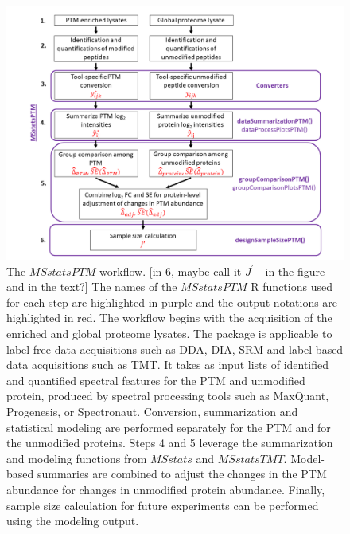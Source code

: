\documentclass[mcp]{article}
\numberwithin{table}{section}
\def\todo#1{{\color{red}[#1]}}
\begin{document}
\begin{figure}[ht]
\centering
\includegraphics[scale=.55]{images/MSstatsPTM_design.png}
\caption{The $MSstatsPTM$ workflow. \todo{in 6, maybe call it $J^{\prime}$ - in the figure and in the text?} The names of the $MSstatsPTM$ R functions used for each step are highlighted in purple and the output notations are highlighted in red. The workflow begins with the acquisition of the enriched and global proteome lysates. The package is applicable to label-free data acquisitions such as DDA, DIA, SRM and label-based data acquisitions such as TMT. It takes as input lists of identified and quantified spectral features for the PTM and unmodified protein, produced by spectral processing tools such as MaxQuant, Progenesis, or Spectronaut.  Conversion, summarization and statistical modeling are performed separately for the PTM and for the unmodified proteins. Steps 4 and 5 leverage the summarization and modeling functions from $MSstats$ and $MSstatsTMT$. Model-based summaries are combined to adjust the changes in the PTM abundance for changes in unmodified protein abundance. Finally, sample size calculation for future experiments can be performed using the modeling output.}
\label{fig:msstatsptm_design}
\end{figure}
\end{document}
